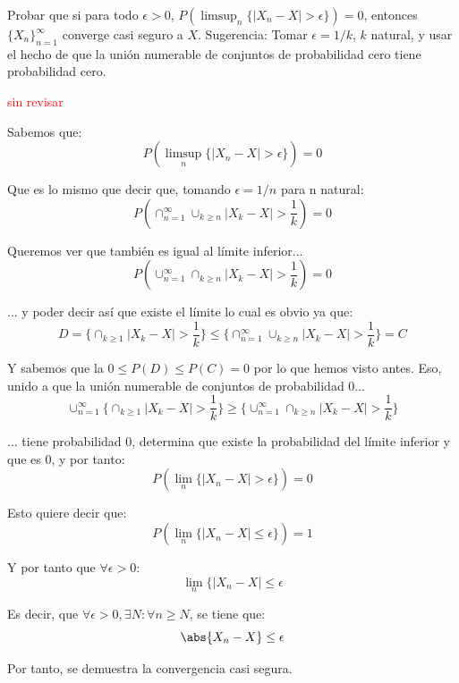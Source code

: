
\begin{problem}[9]Probar que si para todo $\epsilon > 0$,
$P(\limsup_n\{ |X_n - X| > \epsilon\}) = 0$, entonces  $\{X_n\}_{n=1}^{\infty}$  converge casi seguro a $X$.
Sugerencia: Tomar $\epsilon = 1/k$, $k$ natural, y usar el hecho de que la uni\'on numerable de conjuntos
de probabilidad cero tiene probabilidad cero.


\solution
\textcolor{red}{sin revisar}

Sabemos que:
\[
P(\limsup_n\{ |X_n - X| > \epsilon\}) = 0
\]

Que es lo mismo que decir que, tomando $\epsilon = 1/n$ para n natural:
\[
P(\cap_{n=1}^{\infty} \cup_{k\geq n} |X_k - X| > \frac{1}{k}) = 0
\]

Queremos ver que también es igual al límite inferior...
\[
P(\cup_{n=1}^{\infty} \cap_{k\geq n} |X_k - X| > \frac{1}{k}) = 0
\]

... y poder decir así que existe el límite lo cual es obvio ya que:
\[
D=\{\cap_{k\geq 1} |X_k - X| > \frac{1}{k}\} \leq \{\cap_{n=1}^{\infty} \cup_{k\geq n} |X_k - X| > \frac{1}{k}\} = C
\]

Y sabemos que la $0\leq P(D) \leq P(C)=0$ por lo que hemos visto antes. Eso, unido a que la unión numerable de conjuntos de probabilidad 0...
\[
\cup_{n=1}^{\infty} \{\cap_{k\geq 1} |X_k - X| > \frac{1}{k}\} \geq \{\cup_{n=1}^{\infty} \cap_{k\geq n} |X_k - X| > \frac{1}{k}\}
\]

... tiene probabilidad 0, determina que existe la probabilidad del límite inferior y que es 0, y por tanto:
\[
P(\lim_n\{ |X_n - X| > \epsilon\}) = 0
\]

Esto quiere decir que:
\[
P(\lim_n\{ |X_n - X| \leq \epsilon\}) = 1
\]

Y por tanto que $\forall \epsilon > 0$:
\[
\lim_n\{ |X_n - X| \leq \epsilon
\]

Es decir, que $\forall \epsilon > 0, \exists N: \forall n \geq N$, se tiene que:
\[
\abs{X_n -X} \leq \epsilon
\]

Por tanto, se demuestra la convergencia casi segura.

\end{problem}


